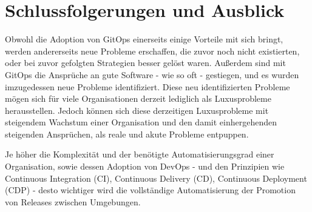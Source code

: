\chapter{Schlussfolgerungen und Ausblick}

Obwohl die Adoption von GitOps einerseits einige Vorteile mit sich bringt,
werden andererseits neue Probleme erschaffen,
die zuvor noch nicht existierten,
oder bei zuvor gefolgten Strategien besser gelöst waren.
Außerdem sind mit GitOps die Ansprüche an
gute Software - wie so oft - gestiegen,
und es wurden imzugedessen neue Probleme identifiziert.
Diese neu identifizierten Probleme mögen sich für viele Organisationen derzeit lediglich
als Luxusprobleme herausstellen.
Jedoch können sich diese derzeitigen Luxusprobleme
mit steigendem Wachstum einer Organisation
und den damit einhergehenden steigenden Ansprüchen,
als reale und akute Probleme
entpuppen.
\bigskip

\noindent
Je höher die Komplexität und der benötigte Automatisierungsgrad einer Organisation, sowie dessen Adoption von DevOps
- und den Prinzipien wie
Continuous Integration (CI),
Continuous Delivery (CD),
Continuous Deployment (CDP) -
desto wichtiger wird die vollständige Automatisierung der Promotion von Releases zwischen Umgebungen.








